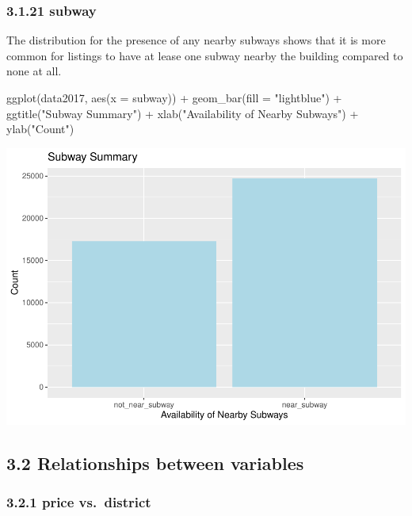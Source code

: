 \documentclass[
]{article}
\newenvironment{Shaded}{\begin{snugshade}}{\end{snugshade}}
\newcommand{\AttributeTok}[1]{\textcolor[rgb]{0.77,0.63,0.00}{#1}}
\newcommand{\FunctionTok}[1]{\textcolor[rgb]{0.00,0.00,0.00}{#1}}
\newcommand{\NormalTok}[1]{#1}
\newcommand{\SpecialCharTok}[1]{\textcolor[rgb]{0.00,0.00,0.00}{#1}}
\newcommand{\StringTok}[1]{\textcolor[rgb]{0.31,0.60,0.02}{#1}}
\begin{document}
\hypertarget{subway}{%
\subsubsection{3.1.21 subway}\label{subway}}

The distribution for the presence of any nearby subways shows that it is
more common for listings to have at lease one subway nearby the building
compared to none at all.

\begin{Shaded}
\begin{Highlighting}[]
\FunctionTok{ggplot}\NormalTok{(data2017, }\FunctionTok{aes}\NormalTok{(}\AttributeTok{x =}\NormalTok{ subway)) }\SpecialCharTok{+}
  \FunctionTok{geom\_bar}\NormalTok{(}\AttributeTok{fill =} \StringTok{"lightblue"}\NormalTok{) }\SpecialCharTok{+}
  \FunctionTok{ggtitle}\NormalTok{(}\StringTok{"Subway Summary"}\NormalTok{) }\SpecialCharTok{+}
  \FunctionTok{xlab}\NormalTok{(}\StringTok{"Availability of Nearby Subways"}\NormalTok{) }\SpecialCharTok{+}
  \FunctionTok{ylab}\NormalTok{(}\StringTok{"Count"}\NormalTok{)}
\end{Highlighting}
\end{Shaded}

\includegraphics{Project_files/figure-latex/unnamed-chunk-38-1.pdf}

\hypertarget{relationships-between-variables}{%
\subsection{3.2 Relationships between
variables}\label{relationships-between-variables}}

\hypertarget{price-vs.-district}{%
\subsubsection{3.2.1 price vs.~district}\label{price-vs.-district}}
\end{document}
